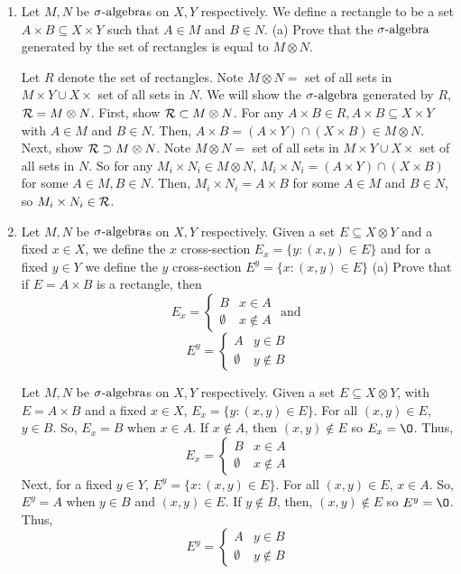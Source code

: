 \begin{enumerate}
\item Let $M,N$ be ${\sigma}\text{-algebra}$s on $X,Y$ respectively. We define a rectangle to be a set $A \times B \subseteq X \times Y$ such that $A \in M$ and $B \in N$.	
\subitem(a) Prove that the ${\sigma}\text{-algebra}$ generated by the set of rectangles is equal to $M \otimes N$.
\begin{pf}
	Let $R$ denote the set of rectangles. Note $M \otimes N = $ set of all sets in $M \times Y \cup X \times$ set of all sets in $N$. We will show the ${\sigma}\text{-algebra}$ generated by $R$, ${\mathcal R}=M \otimes N$. First, show ${\mathcal R} \subset M \otimes N$.
	For any $A \times B \in R, A \times B \subseteq X \times Y$ with $A \in M$ and $B \in N$. Then, $A \times B = (A \times Y) \cap (X \times B) \in M \otimes N$. 
	Next, show ${\mathcal R} \supset M \otimes N$. Note $M \otimes N = $ set of all sets in $M \times Y \cup X \times$ set of all sets in $N$. So for any $M_i \times N_i \in M \otimes N$, $M_i \times N_i = (A \times Y) \cap (X \times B)$ for some $A \in M, B \in N$. Then, $M_i \times N_i = A \times B$ for some $A \in M$ and $B \in N$, so $M_i \times N_i \in {\mathcal R}$. \end{pf}

\item Let $M,N$ be ${\sigma}\text{-algebra}$s on $X,Y$ respectively. Given a set $E\subseteq X \otimes Y$ and a fixed $x\in X$, we define the $x$ cross-section
$
E_x = \{y:(x,y) \in E\}	
$
and for a fixed $y \in Y$ we define the $y$ cross-section $
E^y = \{x:(x,y) \in E\}$	
\subitem(a) Prove that if $E=A \times B$ is a rectangle, then 
 \[  E_x =  \left\{
\begin{array}{ll}
      B & x\in A \\
      \emptyset & x \notin A 
\end{array} \text{ and }
\right. \]
 \[  E^y =  \left\{
\begin{array}{ll}
      A & y\in B \\
      \emptyset & y \notin B 
\end{array} 
\right. \]
\begin{pf}
	Let $M,N$ be ${\sigma}\text{-algebra}$s on $X,Y$ respectively. Given a set $E\subseteq X \otimes Y$, with $E = A \times B$ and a fixed $x\in X$, $E_x=\{y: (x,y)\in E\}$. For all $(x,y) \in E$, $y \in B$. So, $E_x=B$ when $x \in A$. If $x \not \in A$, then $(x,y) \not \in E$ so $E_x = \O$. Thus, 
	\[  E_x =  \left\{
\begin{array}{ll}
      B & x\in A \\
      \emptyset & x \notin A 
\end{array} 
\right. \]
Next, for a fixed $y\in Y$, $E^y=\{x: (x,y)\in E\}$. For all $(x,y) \in E$, $x \in A$. So, $E^y=A$ when $y \in B$ and $(x,y) \in E$. If $y \not \in B$, then, $(x,y) \not\in E$ so $E^y = \O$. Thus, 
\[  E^y =  \left\{
\begin{array}{ll}
      A & y\in B \\
      \emptyset & y \notin B 
\end{array} 
\right. \]
\end{pf}


\end{enumerate}
